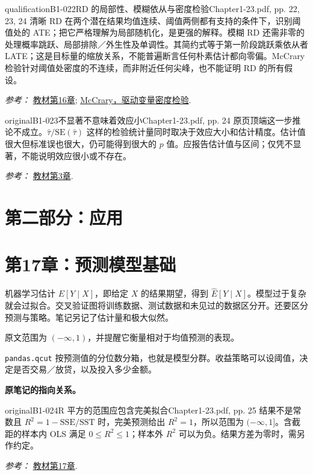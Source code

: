 {\begin{reviewnote}{qualification}{B1-022}{RD 的局部性、模糊依从与密度检验}{Chapter1-23.pdf, pp. 22, 23, 24}
清晰 RD 在两个潜在结果均值连续、阈值两侧都有支持的条件下，识别阈值处的 ATE；把它严格理解为局部随机化，是更强的解释。模糊 RD 还需非零的处理概率跳跃、局部排除／外生性及单调性。其简约式等于第一阶段跳跃乘依从者 LATE；这是目标量的缩放关系，不能普遍断言任何朴素估计都向零偏。McCrary 检验针对阈值处密度的不连续，而非附近任何尖峰，也不能证明 RD 的所有假设。
\par\smallskip\textit{参考：} \href{https://matheusfacure.github.io/python-causality-handbook/16-Regression-Discontinuity-Design.html}{教材第16章}; \href{https://www.nber.org/papers/t0334}{McCrary，驱动变量密度检验}.
\end{reviewnote}

\begin{reviewnote}{original}{B1-023}{不显著不意味着效应小}{Chapter1-23.pdf, pp. 24}
原页顶端这一步推论不成立。$\hat\tau/\mathrm{SE}(\hat\tau)$ 这样的检验统计量同时取决于效应大小和估计精度。估计值很大但标准误也很大，仍可能得到很大的 $p$ 值。应报告估计值与区间；仅凭不显著，不能说明效应很小或不存在。
\par\smallskip\textit{参考：} \href{https://matheusfacure.github.io/python-causality-handbook/03-Stats-Review-The-Most-Dangerous-Equation.html}{教材第3章}.
\end{reviewnote}
\section{第二部分：应用}
\section{第17章：预测模型基础}
机器学习估计 $E[Y\mid X]$，即给定 $X$ 的结果期望，得到 $\widehat E[Y\mid X]$。模型过于复杂就会过拟合。交叉验证图将训练数据、测试数据和未见过的数据区分开。还要区分预测与策略。笔记另记了估计量和极大似然。

 原文范围为 $(-\infty,1)$，并提醒它衡量相对于均值预测的表现。

\texttt{pandas.qcut} 按预测值的分位数分箱，也就是模型分群。收益策略可以设阈值，决定是否交易／放贷，以及投入多少金额。

\par{}\smallskip\textbf{原笔记的指向关系。}\par\smallskip
{}
\begin{reviewnote}{original}{B1-024}{R 平方的范围应包含完美拟合}{Chapter1-23.pdf, pp. 25}
结果不是常数且 $R^2=1-\mathrm{SSE}/\mathrm{SST}$ 时，完美预测给出 $R^2=1$，所以范围为 $(-\infty,1]$。含截距的样本内 OLS 满足 $0\le R^2\le1$；样本外 $R^2$ 可以为负。结果方差为零时，需另作约定。
\par\smallskip\textit{参考：} \href{https://matheusfacure.github.io/python-causality-handbook/17-Predictive-Models-101.html}{教材第17章}.
\end{reviewnote}
}
